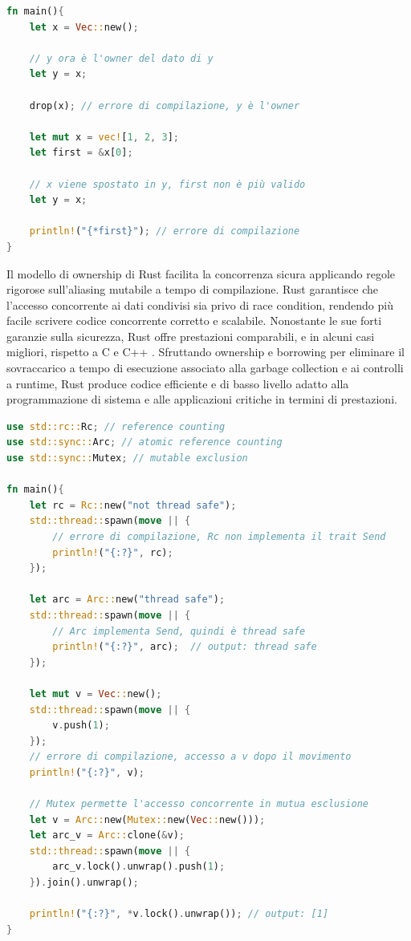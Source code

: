 \vspace{5mm}
\begin{lstlisting}[language=Rust, caption=Controllo dei puntatori in fase di compilazione, label=lis:rust_borrow_checker]
fn main(){
    let x = Vec::new();

    // y ora è l'owner del dato di y
    let y = x;

    drop(x); // errore di compilazione, y è l'owner

    let mut x = vec![1, 2, 3];
    let first = &x[0];

    // x viene spostato in y, first non è più valido
    let y = x;
    
    println!("{*first}"); // errore di compilazione
}
\end{lstlisting}
\vspace{5mm}

Il modello di ownership di Rust facilita la concorrenza sicura applicando regole rigorose sull'aliasing mutabile a tempo di compilazione. Rust garantisce che l'accesso concorrente ai dati condivisi sia privo di race condition, rendendo più facile scrivere codice concorrente corretto e scalabile.
Nonostante le sue forti garanzie sulla sicurezza, Rust offre prestazioni comparabili, e in alcuni casi migliori, rispetto a C e C++ \cite[]{Rust:bench}. Sfruttando ownership e borrowing per eliminare il sovraccarico a tempo di esecuzione associato alla garbage collection e ai controlli a runtime, Rust produce codice efficiente e di basso livello adatto alla programmazione di sistema e alle applicazioni critiche in termini di prestazioni.

\vspace{5mm}
\begin{lstlisting}[language=Rust, caption=Fearless concurrency, label=lis:rust_fearless_concurrency]
use std::rc::Rc; // reference counting
use std::sync::Arc; // atomic reference counting
use std::sync::Mutex; // mutable exclusion

fn main(){
    let rc = Rc::new("not thread safe");
    std::thread::spawn(move || {
        // errore di compilazione, Rc non implementa il trait Send
        println!("{:?}", rc); 
    });

    let arc = Arc::new("thread safe");
    std::thread::spawn(move || {
        // Arc implementa Send, quindi è thread safe
        println!("{:?}", arc);  // output: thread safe
    });

    let mut v = Vec::new();
    std::thread::spawn(move || {
        v.push(1); 
    });
    // errore di compilazione, accesso a v dopo il movimento
    println!("{:?}", v); 

    // Mutex permette l'accesso concorrente in mutua esclusione
    let v = Arc::new(Mutex::new(Vec::new())); 
    let arc_v = Arc::clone(&v);
    std::thread::spawn(move || {
        arc_v.lock().unwrap().push(1); 
    }).join().unwrap(); 

    println!("{:?}", *v.lock().unwrap()); // output: [1]
}
\end{lstlisting}
\vspace{5mm}

